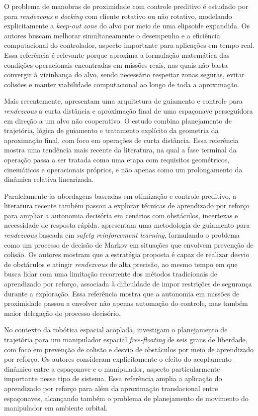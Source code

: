 O problema de manobras de proximidade com controle preditivo é estudado por \cite{wang2023close} para \textit{rendezvous} e \textit{docking} com cliente rotativo ou não rotativo, modelando explicitamente a \textit{keep-out zone} do alvo por meio de uma elipsoide expandida. Os autores buscam melhorar simultaneamente o desempenho e a eficiência computacional do controlador, aspecto importante para aplicações em tempo real. Essa referência é relevante porque aproxima a formulação matemática das condições operacionais encontradas em missões reais, nas quais não basta convergir à vizinhança do alvo, sendo necessário respeitar zonas seguras, evitar colisões e manter viabilidade computacional ao longo de toda a aproximação.

Mais recentemente, \cite{madonna2025guidance} apresentam uma arquitetura de guiamento e controle para \textit{rendezvous} a curta distância e aproximação final de uma espaçonave perseguidora em direção a um alvo não cooperativo. O estudo combina planejamento de trajetória, lógica de guiamento e tratamento explícito da geometria da aproximação final, com foco em operações de curta distância. Essa referência mostra uma tendência mais recente da literatura, na qual a fase terminal da operação passa a ser tratada como uma etapa com requisitos geométricos, cinemáticos e operacionais próprios, e não apenas como um prolongamento da dinâmica relativa linearizada.

Paralelamente às abordagens baseadas em otimização e controle preditivo, a literatura recente também passou a explorar técnicas de aprendizado por reforço para ampliar a autonomia decisória em cenários com obstáculos, incertezas e necessidade de resposta rápida. \cite{sharma2024safety} apresentam uma metodologia de guiamento para \textit{rendezvous} baseada em \textit{safety reinforcement learning}, formulando o problema como um processo de decisão de Markov em situações que envolvem prevenção de colisão. Os autores mostram que a estratégia proposta é capaz de realizar desvio de obstáculos e atingir \textit{rendezvous} de alta precisão, ao mesmo tempo em que busca lidar com uma limitação recorrente dos métodos tradicionais de aprendizado por reforço, associada à dificuldade de impor restrições de segurança durante a exploração. Essa referência mostra que a autonomia em missões de proximidade passou a envolver não apenas automação do controle, mas também maior delegação do processo decisório.

No contexto da robótica espacial acoplada, \cite{alali2024reinforcement} investigam o planejamento de trajetória para um manipulador espacial \textit{free-floating} de seis graus de liberdade, com foco em prevenção de colisão e desvio de obstáculos por meio de aprendizado por reforço. Os autores consideram explicitamente o efeito do acoplamento dinâmico entre a espaçonave e o manipulador, aspecto particularmente importante nesse tipo de sistema. Essa referência amplia a aplicação do aprendizado por reforço para além da aproximação translacional entre espaçonaves, alcançando também o problema de planejamento de movimento do manipulador em ambiente orbital.

